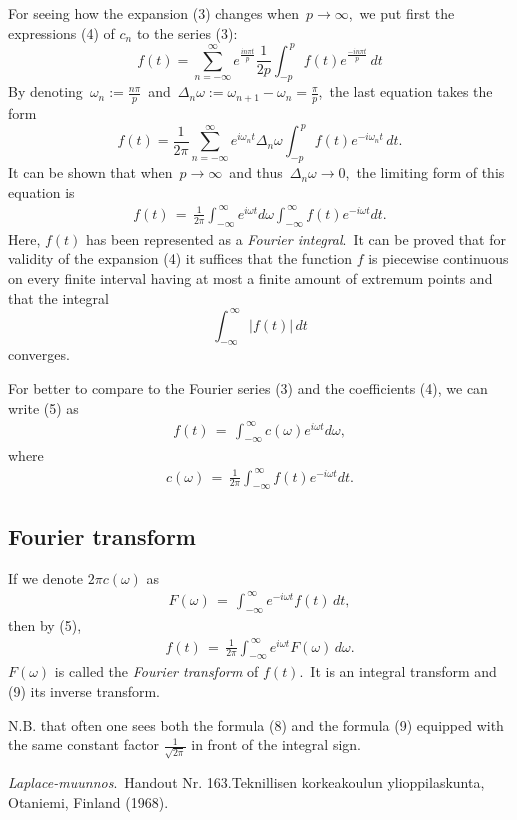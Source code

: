 \documentclass[12pt]{article}
\theoremstyle{definition}
\begin{document}
For seeing how the expansion (3) changes when\, $p \to \infty$,\, we put first the expressions (4) of $c_n$ to the series (3):
$$f(t) = \sum_{n=-\infty}^\infty e^{\frac{in\pi t}{p}}\frac{1}{2p}\int_{-p}^{\,p}f(t)e^{\frac{-in\pi t}{p}}\,dt$$
By denoting\, $\omega_n := \frac{n\pi}{p}$\, and\, $\Delta_n\omega := \omega_{n+1}\!-\!\omega_n = \frac{\pi}{p}$,\, the last equation takes the form
$$f(t) = \frac{1}{2\pi}\sum_{n=-\infty}^\infty e^{i\omega_nt}\Delta_n\omega \int_{-p}^{\,p}f(t)e^{-i\omega_nt}\,dt.$$
It can be shown that when\, $p \to \infty$\, and thus\, $\Delta_n\omega \to 0$,\, the limiting form of this equation is
\begin{align}
f(t) \,=\, \frac{1}{2\pi}\int_{-\infty}^{\,\infty} e^{i\omega t}d\omega\int_{-\infty}^{\,\infty} f(t)e^{-i\omega t}dt.
\end{align}
Here, $f(t)$ has been represented as a {\em Fourier integral}.\, It can be proved that for validity of the expansion (4) it suffices that the function $f$ is piecewise continuous on every finite interval having at most a finite amount of extremum points and that the integral
$$\int_{-\infty}^{\,\infty}|f(t)|\,dt$$
converges.

For better to compare to the Fourier series (3) and the coefficients (4), we can write (5) as
\begin{align}
f(t) \,=\, \int_{-\infty}^{\,\infty}c(\omega)e^{i\omega t}d\omega,
\end{align}
where
\begin{align}
c(\omega) \,=\, \frac{1}{2\pi}\int_{-\infty}^{\,\infty}f(t)e^{-i\omega t}dt.
\end{align}

\subsection{Fourier transform}

If we denote $2\pi c(\omega)$ as
\begin{align}
F(\omega) \,=\, \int_{-\infty}^{\,\infty} e^{-i\omega t}f(t)\,dt,
\end{align}
then by (5),
\begin{align}
f(t) \,=\, \frac{1}{2\pi}\int_{-\infty}^{\,\infty}e^{i\omega t}F(\omega)\,d\omega.
\end{align}
$F(\omega)$ is called the {\em Fourier transform} of $f(t)$.\, It is an integral transform and (9)  its inverse transform.

N.B. that often one sees both the formula (8) and the formula (9) equipped with the same constant factor $\displaystyle\frac{1}{\sqrt{2\pi}}$ in front of the integral sign.

\begin{thebibliography}{9}
 {\em Laplace-muunnos}.\, Handout Nr. 163.\quad Teknillisen korkeakoulun ylioppilaskunta, Otaniemi, Finland (1968).
\end{thebibliography}






\end{document}
